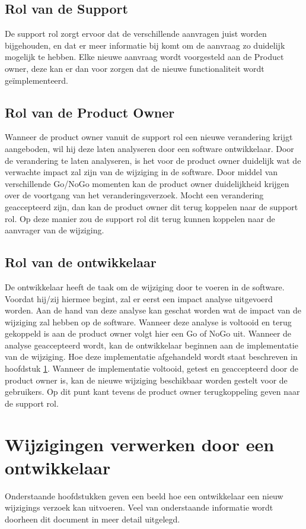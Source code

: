 \subsection{Rol van de Support}
De support rol zorgt ervoor dat de verschillende aanvragen juist worden bijgehouden, en dat er meer informatie bij komt om de aanvraag zo duidelijk mogelijk te hebben. Elke nieuwe aanvraag wordt voorgesteld aan de Product owner, deze kan er dan voor zorgen dat de nieuwe functionaliteit wordt geïmplementeerd.

\subsection{Rol van de Product Owner}
Wanneer de product owner vanuit de support rol een nieuwe verandering krijgt aangeboden, wil hij deze laten analyseren door een software ontwikkelaar. Door de verandering te laten analyseren, is het voor de product owner duidelijk wat de verwachte impact zal zijn van de wijziging in de software. Door middel van verschillende Go/NoGo momenten kan de product owner duidelijkheid krijgen over de voortgang van het veranderingsverzoek.
Mocht een verandering geaccepteerd zijn, dan kan de product owner dit terug koppelen naar de support rol. Op deze manier zou de support rol dit terug kunnen koppelen naar de aanvrager van de wijziging.

\subsection{Rol van de ontwikkelaar}
De ontwikkelaar heeft de taak om de wijziging door te voeren in de software. Voordat hij/zij hiermee begint, zal er eerst een impact analyse uitgevoerd worden. Aan de hand van deze analyse kan geschat worden wat de impact van de wijziging zal hebben op de software.
Wanneer deze analyse is voltooid en terug gekoppeld is aan de product owner volgt hier een Go of NoGo uit. Wanneer de analyse geaccepteerd wordt, kan de ontwikkelaar beginnen aan de implementatie van de wijziging.
Hoe deze implementatie afgehandeld wordt staat beschreven in hoofdstuk \ref{hfd:wd}. Wanneer de implementatie voltooid, getest en geaccepteerd door de product owner is, kan de nieuwe wijziging beschikbaar worden gestelt voor de gebruikers. Op dit punt kant tevens de product owner terugkoppeling geven naar de support rol.

\section{Wijzigingen verwerken door een ontwikkelaar} \label{hfd:wd}
Onderstaande hoofdstukken geven een beeld hoe een ontwikkelaar een nieuw wijzigings verzoek kan uitvoeren.
Veel van onderstaande informatie wordt doorheen dit document in meer detail uitgelegd. 

